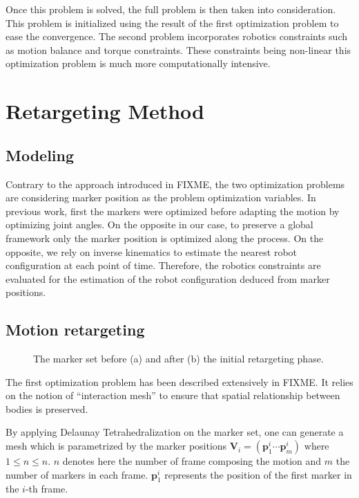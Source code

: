 \documentclass[letterpaper, 10 pt, conference]{ieeeconf}  %
\begin{document}
Once this problem is solved, the full problem is then taken into
consideration. This problem is initialized using the result of the
first optimization problem to ease the convergence. The second problem
incorporates robotics constraints such as motion balance and torque
constraints. These constraints being non-linear this optimization
problem is much more computationally intensive.



\section{Retargeting Method}
\label{sec:retargeting}

\subsection{Modeling}

Contrary to the approach introduced in FIXME, the two optimization
problems are considering marker position as the problem optimization
variables. In previous work, first the markers were optimized before
adapting the motion by optimizing joint angles. On the opposite in our
case, to preserve a global framework only the marker position is
optimized along the process. On the opposite, we rely on inverse
kinematics to estimate the nearest robot configuration at each point
of time. Therefore, the robotics constraints are evaluated for the
estimation of the robot configuration deduced from marker positions.


\subsection{Motion retargeting}


\begin{figure}[htbp!]
  \label{fig:retargeting}
  \caption{The marker set before (a) and after (b) the initial
    retargeting phase.}
\end{figure}


The first optimization problem has been described extensively in
FIXME. It relies on the notion of ``interaction mesh'' to ensure that
spatial relationship between bodies is preserved.

By applying Delaunay Tetrahedralization \cite{FIXME} on the marker
set, one can generate a mesh which is parametrized by the marker
positions $\mathbf{V}_i = (\mathbf{p}^i_1 \cdots \mathbf{p}^i_m)$
where $1 \leq n \leq n$. $n$ denotes here the number of frame
composing the motion and $m$ the number of markers in each
frame. $\mathbf{p}^i_1$ represents the position of the first marker in
the $i$-th frame.
\end{document}
